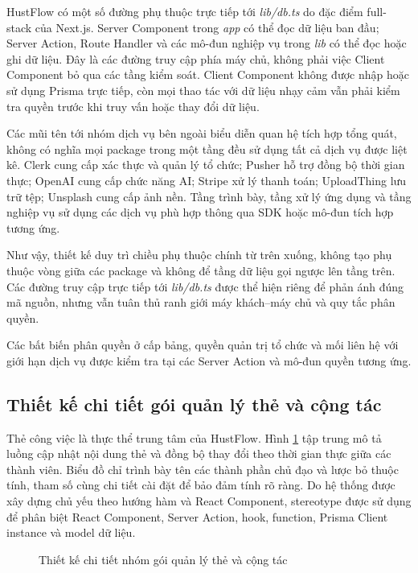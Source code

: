 \documentclass[../DoAn.tex]{subfiles}
\begin{document}
HustFlow có một số đường phụ thuộc trực tiếp tới \textit{lib/db.ts} do đặc điểm full-stack của Next.js. Server Component trong \textit{app} có thể đọc dữ liệu ban đầu; Server Action, Route Handler và các mô-đun nghiệp vụ trong \textit{lib} có thể đọc hoặc ghi dữ liệu. Đây là các đường truy cập phía máy chủ, không phải việc Client Component bỏ qua các tầng kiểm soát. Client Component không được nhập hoặc sử dụng Prisma trực tiếp, còn mọi thao tác với dữ liệu nhạy cảm vẫn phải kiểm tra quyền trước khi truy vấn hoặc thay đổi dữ liệu.

Các mũi tên tới nhóm dịch vụ bên ngoài biểu diễn quan hệ tích hợp tổng quát, không có nghĩa mọi package trong một tầng đều sử dụng tất cả dịch vụ được liệt kê. Clerk cung cấp xác thực và quản lý tổ chức; Pusher hỗ trợ đồng bộ thời gian thực; OpenAI cung cấp chức năng AI; Stripe xử lý thanh toán; UploadThing lưu trữ tệp; Unsplash cung cấp ảnh nền. Tầng trình bày, tầng xử lý ứng dụng và tầng nghiệp vụ sử dụng các dịch vụ phù hợp thông qua SDK hoặc mô-đun tích hợp tương ứng.

Như vậy, thiết kế duy trì chiều phụ thuộc chính từ trên xuống, không tạo phụ thuộc vòng giữa các package và không để tầng dữ liệu gọi ngược lên tầng trên. Các đường truy cập trực tiếp tới \textit{lib/db.ts} được thể hiện riêng để phản ánh đúng mã nguồn, nhưng vẫn tuân thủ ranh giới máy khách--máy chủ và quy tắc phân quyền.

Các bất biến phân quyền ở cấp bảng, quyền quản trị tổ chức và mối liên hệ với giới hạn dịch vụ được kiểm tra tại các Server Action và mô-đun quyền tương ứng.

\subsection{Thiết kế chi tiết gói quản lý thẻ và cộng tác}
\label{subsection:4.1.3}

Thẻ công việc là thực thể trung tâm của HustFlow. Hình \ref{fig:chapter4_card_module_design} tập trung mô tả luồng cập nhật nội dung thẻ và đồng bộ thay đổi theo thời gian thực giữa các thành viên. Biểu đồ chỉ trình bày tên các thành phần chủ đạo và lược bỏ thuộc tính, tham số cùng chi tiết cài đặt để bảo đảm tính rõ ràng. Do hệ thống được xây dựng chủ yếu theo hướng hàm và React Component, stereotype được sử dụng để phân biệt React Component, Server Action, hook, function, Prisma Client instance và model dữ liệu.

\begin{figure}[H]
    \centering
    \caption{Thiết kế chi tiết nhóm gói quản lý thẻ và cộng tác}
    \label{fig:chapter4_card_module_design}
\end{figure}
\end{document}
